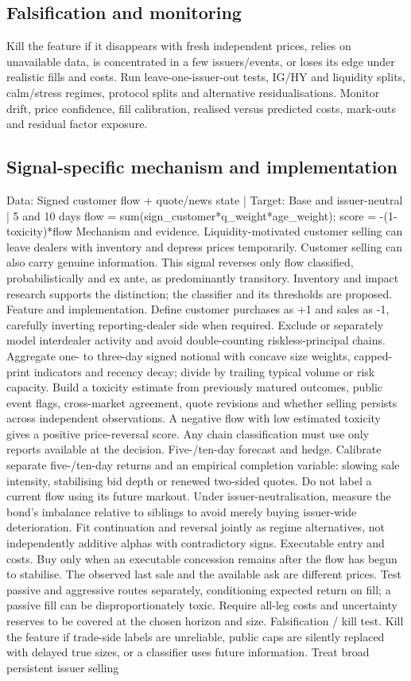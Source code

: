 \documentclass[10pt]{article}
\begin{document}
\subsection{Falsification and monitoring}
Kill the feature if it disappears with fresh independent prices, relies on unavailable data, is concentrated in a few issuers/events, or loses its edge under realistic fills and costs. Run leave-one-issuer-out tests, IG/HY and liquidity splits, calm/stress regimes, protocol splits and alternative residualisations. Monitor drift, price confidence, fill calibration, realised versus predicted costs, mark-outs and residual factor exposure.
\subsection{Signal-specific mechanism and implementation}
Data: Signed customer flow + quote/news state  |  Target: Base and issuer-neutral  |  5 and 10 days flow = sum(sign\_customer*q\_weight*age\_weight); score = -(1-toxicity)*flow Mechanism and evidence.  Liquidity-motivated customer selling can leave dealers with inventory and depress prices temporarily. Customer selling can also carry genuine information. This signal reverses only flow classified, probabilistically and ex ante, as predominantly transitory. Inventory and impact research supports the distinction; the classifier and its thresholds are proposed. Feature and implementation.  Define customer purchases as +1 and sales as -1, carefully inverting reporting-dealer side when required. Exclude or separately model interdealer activity and avoid double-counting riskless-principal chains. Aggregate one- to three-day signed notional with concave size weights, capped-print indicators and recency decay; divide by trailing typical volume or risk capacity. Build a toxicity estimate from previously matured outcomes, public event flags, cross-market agreement, quote revisions and whether selling persists across independent observations. A negative flow with low estimated toxicity gives a positive price-reversal score. Any chain classification must use only reports available at the decision. Five-/ten-day forecast and hedge.  Calibrate separate five-/ten-day returns and an empirical completion variable: slowing sale intensity, stabilising bid depth or renewed two-sided quotes. Do not label a current flow using its future markout. Under issuer-neutralisation, measure the bond’s imbalance relative to siblings to avoid merely buying issuer-wide deterioration. Fit continuation and reversal jointly as regime alternatives, not independently additive alphas with contradictory signs. Executable entry and costs.  Buy only when an executable concession remains after the flow has begun to stabilise. The observed last sale and the available ask are different prices. Test passive and aggressive routes separately, conditioning expected return on fill; a passive fill can be disproportionately toxic. Require all-leg costs and uncertainty reserves to be covered at the chosen horizon and size. Falsification / kill test.  Kill the feature if trade-side labels are unreliable, public caps are silently replaced with delayed true sizes, or a classifier uses future information. Treat broad persistent issuer selling 
\end{document}
